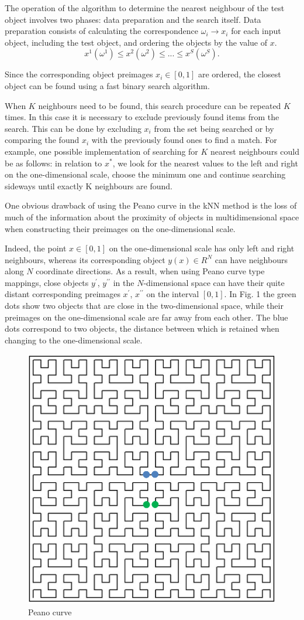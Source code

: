 \documentclass[sensors,article,submit,moreauthors,pdftex]{Definitions/mdpi}
\begin{document}
The operation of the algorithm to determine the nearest neighbour of the test object involves two phases: data preparation and the search itself. Data preparation consists of calculating the correspondence $\omega_i \rightarrow x_i$ for each input object, including the test object, and ordering the objects by the value of $x$.
\begin{equation}
x^1(\omega^1) \leq x^2(\omega^2) \leq ... \leq x^S(\omega^S).
\end{equation} 

Since the corresponding object preimages $x_i \in [0,1]$ are ordered, the closest object can be found using a fast binary search algorithm.

When $K$ neighbours need to be found, this search procedure can be repeated $K$ times. In this case it is necessary to exclude previously found items from the search. This can be done by excluding $x_i$ from the set being searched or by comparing the found $x_i$ with the previously found ones to find a match. For example, one possible implementation of searching for $K$ nearest neighbours could be as follows: in relation to $x^*$, we look for the nearest values to the left and right on the one-dimensional scale, choose the minimum one and continue searching sideways until exactly K neighbours are found.

One obvious drawback of using the Peano curve in the kNN method is the loss of much of the information about the proximity of objects in multidimensional space when constructing their preimages on the one-dimensional scale. 

Indeed, the point $x \in [0,1]$ on the one-dimensional scale has only left and right neighbours, whereas its corresponding object $y(x) \in R^N$ can have neighbours along $N$ coordinate directions. As a result, when using Peano curve type mappings, close objects $y^\prime$, $y^{\prime\prime}$ in the $N$-dimensional space can have their quite distant corresponding preimages $x^\prime$, $x^{\prime\prime}$ on the interval $[0,1]$. In Fig. 1 the green dots show two objects that are close in the two-dimensional space, while their preimages on the one-dimensional scale are far away from each other. The blue dots correspond to two objects, the distance between which is retained when changing to the one-dimensional scale.

\begin{figure}
\center
\includegraphics[width=0.5\linewidth]{fig1.png}
\caption{Peano curve}
\label{fig1}
\end{figure}   
\end{document}
